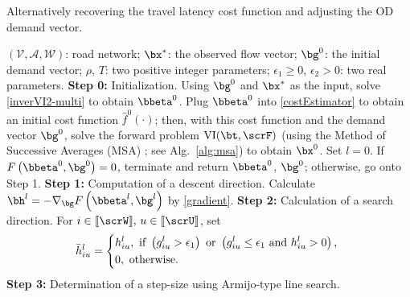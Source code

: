 \documentclass[3p]{elsarticle}
\newcommand*{\defeq}{\stackrel{\text{def}}{=}}
\begin{document}
\begin{algorithm}
\caption{Alternatively recovering the travel latency cost function and
  adjusting the OD demand vector.}
\label{alg:joint}
\begin{algorithmic}[1]
			\Require  $\left( {\mathcal{V}, \mathcal{A}, \mathcal{W}}
			\right)$: road network; ${\bx^*}$: the observed flow vector; ${\bg^0}$: the initial demand vector; $\rho$, $T$: two positive integer parameters;
			$\epsilon_1 \geq 0$, $\epsilon_2 > 0$: two real parameters. 
			\State \textbf{Step 0:} Initialization. Using $\bg^{{0}}$ and ${\bx^*}$ as the input, solve \eqref{inverVI2-multi} to obtain $\bbeta^{{0}}$. Plug $\bbeta^{{0}}$ into \eqref{costEstimator} to obtain an initial cost function $\hat f^0(\cdot)$; then, with this cost function and the demand vector $\bg^{{0}}$, solve the forward problem $\text{VI}(\bt,\scrF)$ (using the Method of Successive Averages (MSA) \cite{noriega2007algorithmic}; see Alg.~\ref{alg:msa}) to obtain $\bx^{{0}}$. Set $l=0$. If $F\left(\bbeta^0,\bg^{{0}}\right) = 0$, terminate and return $\bbeta^0$, $\bg^0$; otherwise, go onto Step 1.
			\State \textbf{Step 1:} Computation of a descent direction. Calculate ${\bh^l} =  - \nabla_{\bg} F\left(\bbeta^l, {{\bg ^l}} \right)$ by \eqref{gradient}.
			\State \textbf{Step 2:} Calculation of a search direction. For $i \in [\kern-0.15em[ \scrW 
			]\kern-0.15em], \,u \in [\kern-0.15em[ \scrU 
			]\kern-0.15em]$, set 
			$$\bar h_{iu}^l = \left\{ \begin{gathered}
			h_{iu}^l,{\text{  if }}\left( {g _{iu}^l > \epsilon_1 } \right){\text{ or }}\left( {g _{iu}^l \leq \epsilon_1 {\text{ and }}h_{iu}^l > 0} \right){\text{, }} \hfill \\
			0,{\text{  otherwise.}} \hfill \\ 
			\end{gathered}  \right.$$
			\State \textbf{Step 3:} Determination of a step-size using Armijo-type line search. 
\end{algorithmic}
\end{algorithm}
\end{document}
